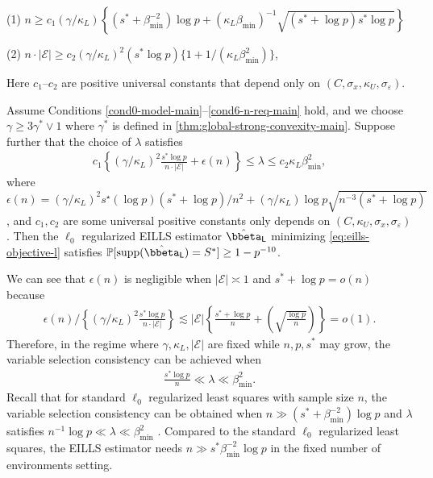 \documentclass[10pt]{article}
\numberwithin{equation}{section}
\newcommand*{\supp}{\mathrm{supp}}
\begin{document}
{\begin{condition}
\noindent (1) $n \ge c_1 (\gamma/\kappa_L) \left\{(s^* +  \beta_{\min}^{-2})\log p + (\kappa_L\beta_{\min})^{-1} \sqrt{(s^* + \log p) s^*\log p}\right\}$
    
\noindent (2) $n \cdot |\mathcal{E}| \ge c_2 (\gamma/\kappa_L)^2 (s^* \log p ) \{1 + 1/ (\kappa_L \beta_{\min}^2 ) \}$, 
    
\noindent Here $c_1$--$c_2$ are positive universal constants that depend only on $(C,\sigma_x,\kappa_U, \sigma_\varepsilon)$.
\end{condition} 

\begin{theorem}  
\label{thm:high-dim-main}  Assume Conditions \ref{cond0-model-main}--\ref{cond6-n-req-main} hold, and we choose $\gamma \ge 3\gamma^* \lor 1$ where $\gamma^*$ is defined in \cref{thm:global-strong-convexity-main}. Suppose further that the choice of $\lambda$ satisfies
\begin{align*}
    c_1 \left\{ (\gamma/\kappa_L)^2 \frac{s^*\log p}{n \cdot |\mathcal{E}|} + \epsilon(n) \right\} \le \lambda \le c_2 \kappa_L \beta_{\min}^2,
\end{align*} where $\epsilon(n) = (\gamma/\kappa_L)^2 s^\star (\log p)(s^* + \log p) / n^2 + (\gamma/\kappa_L) \log p \sqrt{n^{-3}(s^* + \log p)}$, and  $c_1, c_2$ are some universal positive constants only depends on $(C,\kappa_U, \sigma_x,\sigma_\varepsilon)$. Then the $\ell_0$ regularized EILLS estimator $\hat{\bbeta}_{\mathsf{L}}$ minimizing \eqref{eq:eills-objective-l} satisfies $\mathbb{P}[\supp(\hat{\bbeta}_{\mathsf{L}}) = S^*] \ge 1-p^{-10}$.
\end{theorem}

We can see that $\epsilon(n)$ is negligible when $|\mathcal{E}| \asymp 1$ and $s^*+\log p = o(n)$ because 
\begin{align*}
    \epsilon(n) \Big/ \left\{ (\gamma/\kappa_L)^2\frac{s^* \log p}{n \cdot |\mathcal{E}|}\right\} \lesssim |\mathcal{E}| \left\{ \frac{s^*+\log p}{n} + 
    \left(\sqrt{\frac{\log p}{n}}\right) \right\} = o(1).
\end{align*} Therefore, in the regime where $\gamma, \kappa_L, |\mathcal{E}|$ are fixed while $n, p, s^*$ may grow, the variable selection consistency can be achieved when 
\begin{align*}
\frac{s^* \log p}{n}\ll \lambda \ll \beta_{\min}^2.
\end{align*}  Recall that for standard $\ell_0$ regularized least squares with sample size $n$, the variable selection consistency can be obtained when $n \gg (s^* + \beta_{\min}^{-2})\log p$ and $\lambda$ satisfies $n^{-1} \log p \ll \lambda \ll \beta_{\min}^2$ \citep{zhang2012general}. Compared to the standard $\ell_0$ regularized least squares, the EILLS estimator needs $n \gg s^* \beta_{\min}^{-2} \log p$ in the fixed number of environments setting.


}
\end{document}
